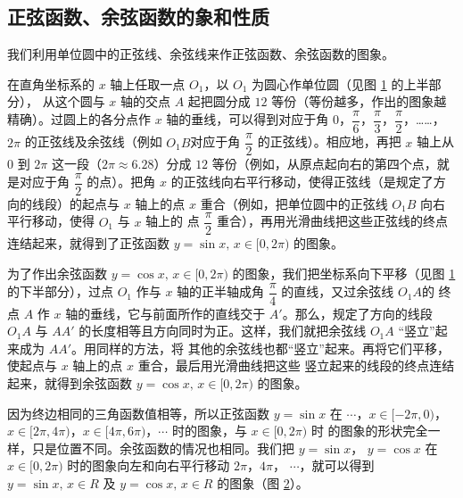 \subsection{正弦函数、余弦函数的象和性质}\label{subsec:2-8}

我们利用单位圆中的正弦线、余弦线来作正弦函数、余弦函数的图象。

\begin{figure}[htbp]
    \centering
    
    \caption{}\label{fig:2-19}
\end{figure}

在直角坐标系的 $x$ 轴上任取一点 $O_1$，以 $O_1$ 为圆心作单位圆（见图 \ref{fig:2-19} 的上半部分），
从这个圆与 $x$ 轴的交点 $A$ 起把圆分成 $12$ 等份（等份越多，作出的图象越精确）。过圆上的各分点作
$x$ 轴的垂线，可以得到对应于角 $0$，$\dfrac \pi 6$，$\dfrac \pi 3$，$\dfrac \pi 2$，……，$2\pi$ \vspace{0.5em}
的正弦线及余弦线（例如 $O_1B$对应于角 $\dfrac \pi 2$ 的正弦线）。相应地，再把 $x$ 轴上从 $0$ 到
$2\pi$ 这一段（$2\pi \approx 6.28$）分成 $12$ 等份（例如，从原点起向右的第四个点，就是对应于角
$\dfrac \pi 2$ 的点）。把角 $x$ 的正弦线向右平行移动，使得正弦线（是规定了方向的线段）的起点与
$x$ 轴上的点 $x$ 重合（例如，把单位圆中的正弦线 $O_1B$ 向右平行移动，使得 $O_1$ 与 $x$ 轴上的
点 $\dfrac \pi 2$ 重合），再用光滑曲线把这些正弦线的终点连结起来，就得到了正弦函数
$y = \sin x, \, x \in [0, 2\pi)$ 的图象。

为了作出余弦函数 $y = \cos x, \, x \in [0, 2\pi)$ 的图象，我们把坐标系向下平移（见图 \ref{fig:2-19}
的下半部分），过点 $O_1$ 作与 $x$ 轴的正半轴成角 $\dfrac \pi 4$ 的直线，又过余弦线 $O_1A$的
终点 $A$ 作 $x$ 轴的垂线，它与前面所作的直线交于 $A'$。那么，规定了方向的线段 $O_1A$ 与 $AA'$
的长度相等且方向同时为正。这样，我们就把余弦线 $O_1A$ “竖立”起来成为 $AA'$。用同样的方法，将
其他的余弦线也都“竖立”起来。再将它们平移，使起点与 $x$ 轴上的点 $x$ 重合，最后用光滑曲线把这些
竖立起来的线段的终点连结起来，就得到余弦函数 $y = \cos x, \, x \in [0, 2\pi)$ 的图象。

因为终边相同的三角函数值相等，所以正弦函数 $y = \sin x$ 在 $\cdots$，$x \in [-2\pi, 0)$，
$x \in [2\pi, 4\pi)$，$x \in [4\pi, 6\pi)$，$\cdots$ 时的图象，与 $x \in [0, 2\pi)$ 时
的图象的形状完全一样，只是位置不同。余弦函数的情况也相同。我们把 $y = \sin x$，
$y = \cos x$ 在 $x \in [0, 2\pi)$ 时的图象向左和向右平行移动 $2\pi$，$4\pi$，
$\cdots$，就可以得到 $y = \sin x, \, x \in R$ 及 $y = \cos x, \, x \in R$ 的图象（图 \ref{fig:2-20}）。

\begin{figure}[htbp]
    \centering
    
    \caption{}\label{fig:2-20}
\end{figure}

